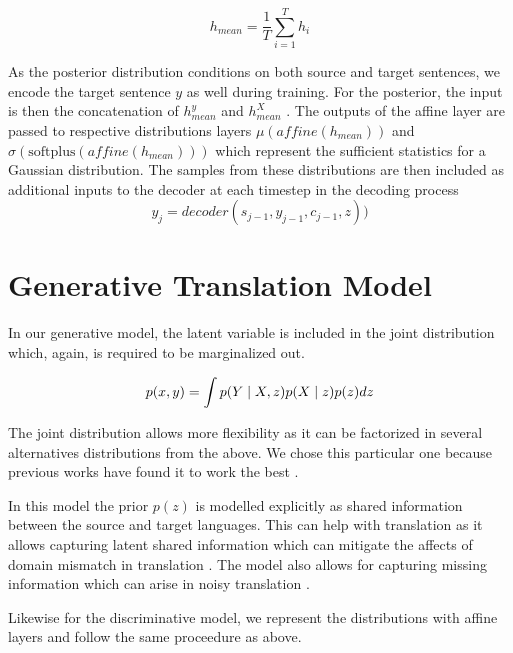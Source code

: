 \begin{equation}
	h_{mean} = \frac{1}{T} \sum_{i=1}^{T} h_{i}
\end{equation}

As the  posterior distribution conditions on both source and target sentences, we encode the target sentence $y$ as well during training. For the posterior, the input is then the concatenation of $h_{mean}^y$ and $h_{mean}^X$ . The outputs of the affine layer are passed to respective distributions layers $\mu(affine(h_{mean}))$ and $\sigma(\text{softplus} (affine(h_{mean})))$ which represent the sufficient statistics for a Gaussian distribution. The samples from these distributions are then included as additional inputs to the decoder at each timestep in the decoding process
\begin{equation}
	y_{j} = decoder(s_{j-1}, y_{j-1}, c_{j-1}, z))
\end{equation}




\section{Generative Translation Model}

In our generative model, the latent variable is included in the joint distribution which, again, is required to be marginalized out.

\begin{equation}
	p(x, y) = \int p(Y \; | \;{X, z})  p(X \; | \;{z}) p(z) dz
\end{equation}

The joint distribution allows more flexibility as it can be factorized in several alternatives distributions from the above. We chose this particular one because previous works have found it to work the best \cite{eikema2018AEVNMT,harshil2018GNMT}. 

In this model the prior $p(z)$ is modelled explicitly as shared information between the source and target languages. This can help with translation as it allows capturing latent shared information which can mitigate the affects of domain mismatch in translation \cite{eikema2018AEVNMT}. The model also allows for capturing missing information which can arise in noisy translation \cite{harshil2018GNMT}. 





Likewise for the discriminative model, we represent the distributions with affine layers and follow the same proceedure as above.

